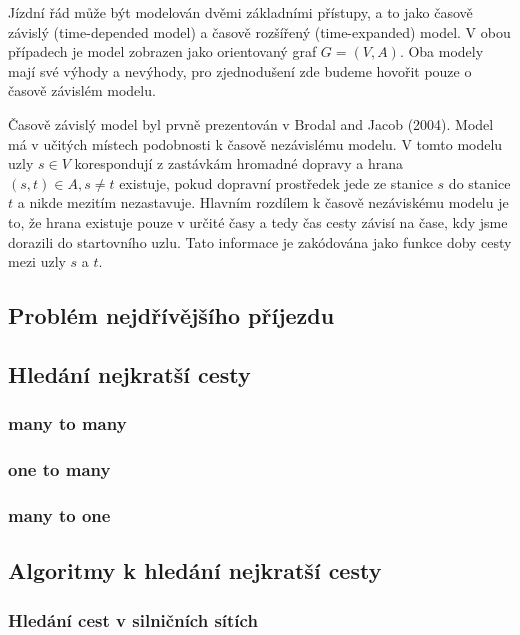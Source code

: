 \documentclass[thesis=M,czech]{FITthesis}[2019/12/23]
\theoremstyle{plain}
\theoremstyle{definition}
\begin{document}
Jízdní řád může být modelován dvěmi základními přístupy, a to jako časově závislý (time-depended model) a časově rozšířený (time-expanded) model. V obou případech je model zobrazen jako orientovaný graf $G = (V, A)$. Oba modely mají své výhody a nevýhody, pro zjednodušení zde budeme hovořit pouze o časově závislém modelu. 

Časově závislý model byl prvně prezentován v Brodal and Jacob (2004)\cite{time-dependent-networks-as-models-to-achieve-fast-exact-time-table-queries}. Model má v učitých místech podobnosti k časově nezávislému modelu. V tomto modelu uzly  $ s \in V $ korespondují z zastávkám hromadné dopravy a hrana $ (s, t) \in A, s \neq t $ existuje, pokud dopravní prostředek jede ze stanice $s$ do stanice $t$ a nikde mezitím nezastavuje. Hlavním rozdílem k časově nezáviskému modelu je to, že hrana existuje pouze v určité časy a tedy čas cesty závisí na čase, kdy jsme dorazili do startovního uzlu. Tato informace je zakódována jako funkce doby cesty mezi uzly $s$ a $t$.


\subsection{Problém nejdřívějšího příjezdu}


\subsection{Hledání nejkratší cesty}

\subsubsection{many to many}

\subsubsection{one to many}

\subsubsection{many to one}


\subsection{Algoritmy k hledání nejkratší cesty}
\subsubsection{Hledání cest v silničních sítích}
\end{document}
